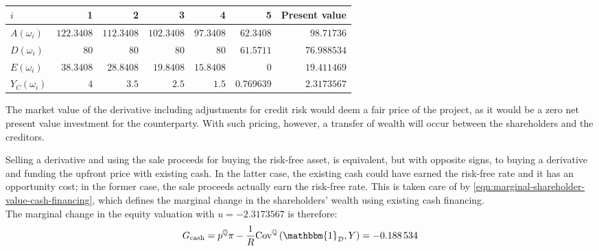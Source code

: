 \documentclass[../main.tex]{subfiles}
\begin{document}
            \begin{table}[H]
                \centering
                \begin{tabular}{l|rrrrr||r}
                    $i$ & 1 & 2 & 3 & 4 & 5 & Present value \\
                    \hline
                    $A(\omega_{i})$ & $\num{122.3408}$ & $\num{112.3408}$ & $\num{102.3408}$ & $\num{97.3408}$ & $\num{62.3408}$ & $\num{98.71736}$ \\
                    $D(\omega_{i})$ & $\num{80}$ & $\num{80}$ & $\num{80}$ & $\num{80}$ & $\num{61.5711}$ & $\num{76.988534}$ \\
                    $E(\omega_{i})$ & $38.3408$ & $\num{28.8408}$ & $\num{19.8408}$ & $\num{15.8408}$ & $\num{0}$ & $\num{19.411469}$ \\
                    $Y_C(\omega_{i})$ & $\num{4}$ & $\num{3.5}$ & $\num{2.5}$ & $\num{1.5}$ & $\num{0.769639}$ & $\num{2.3173567}$ \\
                \end{tabular}
                \caption{}
                \label{tbl:example-no-funding-buyback}
            \end{table}

            The market value of the derivative including adjustments for credit risk would deem a fair price of the project,
            as it would be a zero net present value investment for the counterparty.
            With such pricing, however, a transfer of wealth will occur between the shareholders and the creditors.

            Selling a derivative and using the sale proceeds for buying the risk-free asset,
            is equivalent, but with opposite signs,
            to buying a derivative and funding the upfront price with existing cash.
            In the latter case, the existing cash could have earned the risk-free rate
            and it has an opportunity cost;
            in the former case, the sale proceeds actually earn the risk-free rate.
            This is taken care of by \cref{eqn:marginal-shareholder-value-cash-financing},
            which defines the marginal change in the shareholders' wealth using existing cash financing.
            \\
            The marginal change in the equity valuation with $u=\num{-2.3173567}$ is therefore:
            \begin{equation*}
                G_{\text{cash}} = p^{\rnmeasure}\pi
                -\discountfactor \text{Cov}^{\rnmeasure}\left(\mathbbm{1}_{\mathcal{D}},Y\right) = \num{-0.188534}
            \end{equation*}
\end{document}

